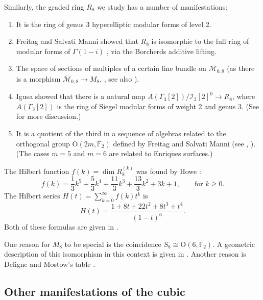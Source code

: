 \documentclass{amsart}
\theoremstyle{definition}
\theoremstyle{remark}
\newcommand{\sfrac}[2]{{\textstyle \frac{#1}{#2}}}
\def\F{\mathbb{F}}
\let\mc\mathcal
\let\ol\overline
\begin{document}
Similarly, the graded ring $R_8$ we study has a number of manifestations:
\begin{enumerate}
\item It is the ring of genus $3$ hyperelliptic modular forms of level 2.
\item Freitag and Salvati Manni showed that $R_8$ is isomorphic to the
  full ring of modular forms of $\Gamma(1-i)$ \cite[p.~2]{fs}, via
 the Borcherds additive lifting.
\item The space of sections of multiples of a certain line bundle on
$\ol{\mc{M}}_{0,8}$ (as there is a morphism $\ol{\mc{M}}_{0,8} \to M_8$,
\cite{kapranov}, see also \cite{avritzerlange}).
\item Igusa \cite{igusa} showed that there is a natural map $A(\Gamma_3[2])/
\mc{I}_3[2]^0 \to R_8$, where $A(\Gamma_3[2])$ is the ring of Siegel modular forms
of weight 2 and genus 3. (See \cite[\S 3]{fs} for more discussion.)\item It is a quotient of the third in a sequence of algebras related to the
orthogonal group $\mathrm{O}(2m, \F_2)$ defined by Freitag and Salvati
Manni (see \cite{fs1}, \cite[\S 2]{fs}).  (The cases $m=5$ and $m=6$ are
related to Enriques surfaces.)
\end{enumerate}
The Hilbert function $f(k) = \dim{R_8^{(k)}}$ was found by Howe
\cite[p.~155, \S 5.4.2.3]{howe}:
\begin{displaymath}
f(k) = \sfrac{1}{3} k^5 + \sfrac{5}{3} k^4 + \sfrac{11}{3} k^3+
\sfrac{13}{3} k^2+3k+1,\qquad \textrm{for $k \ge 0$.} 
\end{displaymath}
The Hilbert series $H(t) = \sum_{k=0}^\infty f(k) t^k$ is 
\begin{displaymath}
H(t) = \frac{1+8t+22t^2+8t^3+t^4}{(1-t)^6}.
\end{displaymath}
Both of these formulas are given in \cite[p.~7]{fs}.

One reason for $M_8$ to be special is the coincidence $S_8 \cong
\mathrm{O}(6, \F_2)$.  A geometric description of this isomorphism in this
context is given in \cite[\S 4]{fs}.  Another reason is Deligne and Mostow's
table \cite[p.~86]{dm}.


\subsection{Other manifestations of the cubic}
\end{document}
